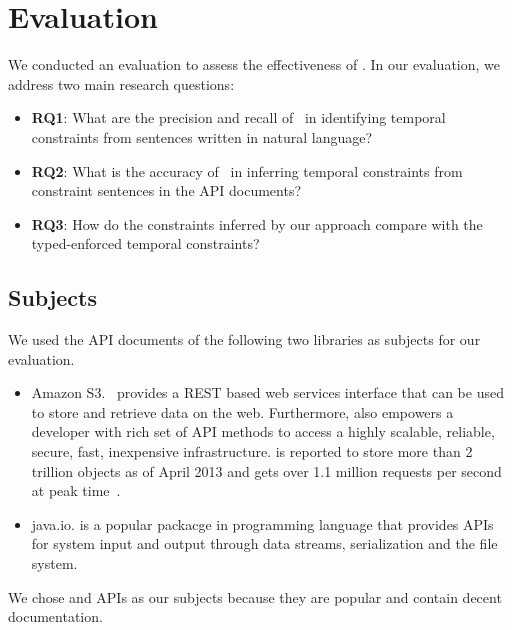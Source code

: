 \section{Evaluation}
\label{sec:evaluation}

We conducted an evaluation to assess the effectiveness of \tool. In our evaluation, we address two main research questions:

\begin{itemize}
	\item\textbf{RQ1}: What are the precision and recall of \tool\ in identifying temporal constraints from sentences written in natural language?
	\item\textbf{RQ2}: What is the accuracy of \tool\ in inferring temporal constraints from constraint sentences in the API documents?
	\item\textbf{RQ3}: How do the constraints inferred by our approach compare with the typed-enforced temporal constraints?
 
\end{itemize}

\subsection{Subjects}
\label{sub:subject}

We used the API documents of the following two libraries as subjects for our evaluation. 
\begin{itemize}
	\item{Amazon S3}. \amazon\ provides a REST based web services interface that can be used to store and retrieve data on the web. Furthermore,  also empowers a developer with rich set of API methods to access a highly scalable, reliable, secure, fast, inexpensive infrastructure.  is reported to store more than 2 trillion objects as of April 2013 and gets over 1.1 million requests per second at peak time~\cite{amazons3stats}.

	\item{java.io}.  is a popular packacge in  programming language that provides APIs for system input and output through data streams, serialization and the file system.
\end{itemize}
We chose  and  APIs as our subjects because they are popular and contain decent documentation.

